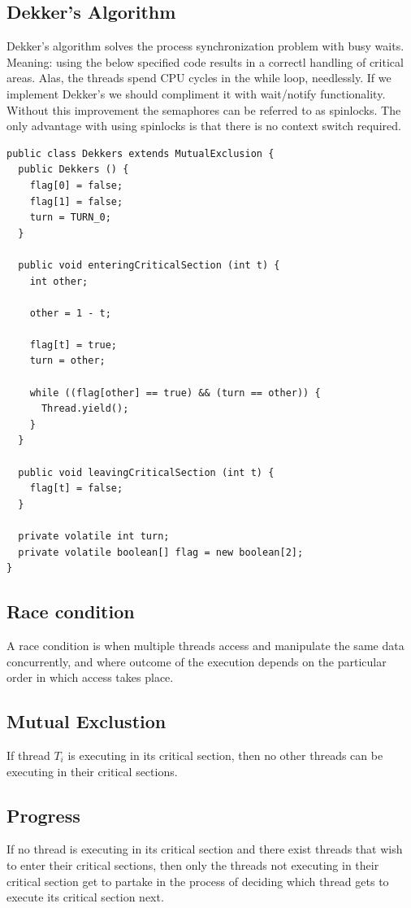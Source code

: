 \documentclass[a4paper]{article}
\begin{document}
\subsection{Dekker's Algorithm}
Dekker's algorithm solves the process synchronization problem with busy waits.
Meaning: using the below specified code results in a correctl handling of
critical areas. Alas, the threads spend CPU cycles in the while loop, needlessly.
If we implement Dekker's we should compliment it with wait/notify functionality.
Without this improvement the semaphores can be referred to as spinlocks.
The only advantage with using spinlocks is that there is no context switch
required.

\begin{lstlisting}[label=dekkers,caption=Dekker's Algorithm]
public class Dekkers extends MutualExclusion {
  public Dekkers () {
    flag[0] = false;
    flag[1] = false;
    turn = TURN_0;
  }

  public void enteringCriticalSection (int t) {
    int other;

    other = 1 - t;

    flag[t] = true;
    turn = other;

    while ((flag[other] == true) && (turn == other)) {
      Thread.yield();
    }
  }

  public void leavingCriticalSection (int t) {
    flag[t] = false;
  }

  private volatile int turn;
  private volatile boolean[] flag = new boolean[2];
}
\end{lstlisting}

\subsection{Race condition}
A race condition is when multiple threads access and manipulate the same
data concurrently, and where outcome of the execution depends on the
particular order in which access takes place.

\subsection{Mutual Exclustion}
If thread $T_i$ is executing in its critical section, then no other threads
can be executing in their critical sections.

\subsection{Progress}
If no thread is executing in its critical section and there exist threads
that wish to enter their critical sections, then only the threads not executing
in their critical section get to partake in the process of deciding which
thread gets to execute its critical section next.
\end{document}
